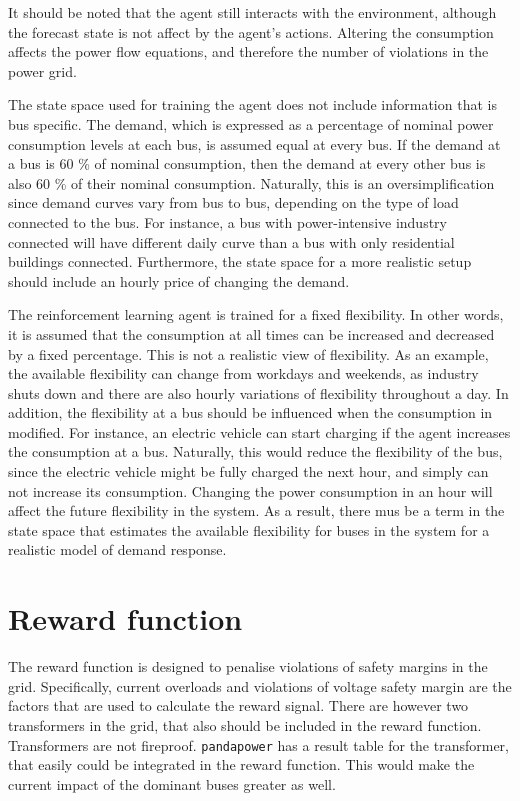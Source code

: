 \documentclass[class=book, crop=false, 11pt]{standalone}
\begin{document}
It should be noted that the agent still interacts with the environment, although the forecast state is not affect by the agent's actions. Altering the consumption affects the power flow equations, and therefore the number of violations in the power grid. 


The state space used for training the agent does not include information that is bus specific. The demand, which is expressed as a percentage of nominal power consumption levels at each bus, is assumed equal at every bus. If the demand at a bus is 60 \% of nominal consumption, then the demand at every other bus is also 60 \% of their nominal consumption. Naturally, this is an oversimplification since demand curves vary from bus to bus, depending on the type of load connected to the bus. For instance, a bus with power-intensive industry connected will have different daily curve than a bus with only residential buildings connected. Furthermore, the state space for a more realistic setup should include an hourly price of changing the demand.

The reinforcement learning agent is trained for a fixed flexibility. In other words, it is assumed that the consumption at all times can be increased and decreased by a fixed percentage. This is not a realistic view of flexibility. As an example, the available flexibility can change from workdays and weekends, as industry shuts down and there are also hourly variations of flexibility throughout a day. In addition, the flexibility at a bus should be influenced when the consumption in modified. For instance, an electric vehicle can start charging if the agent increases the consumption at a bus. Naturally, this would reduce the flexibility of the bus, since the electric vehicle might be fully charged the next hour, and simply can not increase its consumption. Changing the power consumption in an hour will affect the future flexibility in the system. As a result, there mus be a term in the state space that estimates the available flexibility for buses in the system for a realistic model of demand response. 

\section{Reward function}
The reward function is designed to penalise violations of safety margins in the grid. Specifically, current overloads and violations of voltage safety margin are the factors that are used to calculate the reward signal. There are however two transformers in the grid, that also should be included in the reward function. Transformers are not fireproof. \texttt{pandapower} has a result table for the transformer, that easily could be integrated in the reward function. This would make the current impact of the dominant buses greater as well. 
\end{document}
